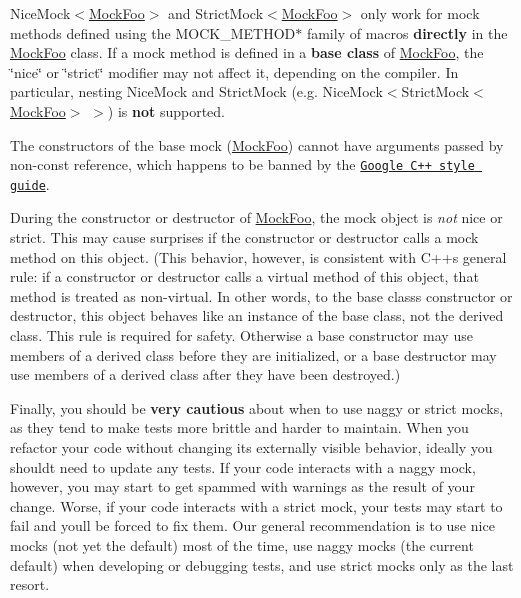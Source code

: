 \begin{DoxyEnumerate}
\item {\ttfamily Nice\+Mock$<$\hyperlink{class_mock_foo}{Mock\+Foo}$>$} and {\ttfamily Strict\+Mock$<$\hyperlink{class_mock_foo}{Mock\+Foo}$>$} only work for mock methods defined using the {\ttfamily M\+O\+C\+K\+\_\+\+M\+E\+T\+H\+O\+D$\ast$} family of macros {\bfseries directly} in the {\ttfamily \hyperlink{class_mock_foo}{Mock\+Foo}} class. If a mock method is defined in a {\bfseries base class} of {\ttfamily \hyperlink{class_mock_foo}{Mock\+Foo}}, the \char`\"{}nice\char`\"{} or \char`\"{}strict\char`\"{} modifier may not affect it, depending on the compiler. In particular, nesting {\ttfamily Nice\+Mock} and {\ttfamily Strict\+Mock} (e.\+g. {\ttfamily Nice\+Mock$<$Strict\+Mock$<$\hyperlink{class_mock_foo}{Mock\+Foo}$>$ $>$}) is {\bfseries not} supported.
\end{DoxyEnumerate}
\begin{DoxyEnumerate}
\item The constructors of the base mock ({\ttfamily \hyperlink{class_mock_foo}{Mock\+Foo}}) cannot have arguments passed by non-\/const reference, which happens to be banned by the \href{http://google-styleguide.googlecode.com/svn/trunk/cppguide.xml}{\tt Google C++ style guide}.
\end{DoxyEnumerate}
\begin{DoxyEnumerate}
\item During the constructor or destructor of {\ttfamily \hyperlink{class_mock_foo}{Mock\+Foo}}, the mock object is {\itshape not} nice or strict. This may cause surprises if the constructor or destructor calls a mock method on {\ttfamily this} object. (This behavior, however, is consistent with C++\textquotesingle{}s general rule\+: if a constructor or destructor calls a virtual method of {\ttfamily this} object, that method is treated as non-\/virtual. In other words, to the base class\textquotesingle{}s constructor or destructor, {\ttfamily this} object behaves like an instance of the base class, not the derived class. This rule is required for safety. Otherwise a base constructor may use members of a derived class before they are initialized, or a base destructor may use members of a derived class after they have been destroyed.)
\end{DoxyEnumerate}

Finally, you should be {\bfseries very cautious} about when to use naggy or strict mocks, as they tend to make tests more brittle and harder to maintain. When you refactor your code without changing its externally visible behavior, ideally you should\textquotesingle{}t need to update any tests. If your code interacts with a naggy mock, however, you may start to get spammed with warnings as the result of your change. Worse, if your code interacts with a strict mock, your tests may start to fail and you\textquotesingle{}ll be forced to fix them. Our general recommendation is to use nice mocks (not yet the default) most of the time, use naggy mocks (the current default) when developing or debugging tests, and use strict mocks only as the last resort.


